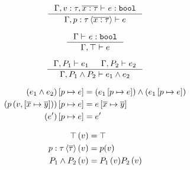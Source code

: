 \documentclass[10pt,a4paper]{article}
\begin{document}
\hfill{}

$$
\inference{
	\hasType{\Gamma, v:\tau, \listOf{x:\tau}}{}{e}{\tbool}
}{
	\isWellFormedP{\Gamma}{\pdVar{p}{\tau}{\listOf{x:\tau}}}{e}
}[]
$$

$$
\inference{
	\hasType{\Gamma}{}{e}{\tbool}
}{
	\isWellFormedP{\Gamma}{\pdTrue}{e}
}[]
$$

$$
\inference{
	\isWellFormedP{\Gamma}{P_1}{e_1} &
	\isWellFormedP{\Gamma}{P_2}{e_2}
}{
	\isWellFormedP{\Gamma}{\pdAnd{P_1}{P_2}}{e_1 \land e_2}
}[]
$$

\hfill{}

\begin{align*}
(e_1 \land e_2)  \left[ p \mapsto e \right]  &= (e_1  \left[ p \mapsto e \right] ) \land (e_1  \left[ p \mapsto e \right] )\\
( p \left( v,  \left[ \overline{x} \mapsto \overline{y} \right]  \right) )  \left[ p \mapsto e \right]  &= e \left[ \overline{x} \mapsto \overline{y} \right]  \\
(e')  \left[ p \mapsto e \right]  &= e'
\end{align*}

\hfill{}

\begin{align*}
 \top \left( v \right)  &= \top \\
 p : \tau \left\langle \overline{\tau} \right\rangle  \left( v \right)  &= p(v) \\
 P_1 \land P_2 \left( v \right)  &= { P_1 \left( v \right) }{ P_2 \left( v \right) }
\end{align*}

\hfill{}
\end{document}
